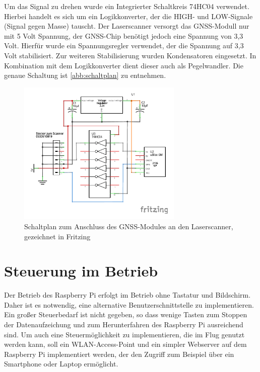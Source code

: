 \documentclass[a4paper,12pt,bibliography=totoc, listof=totoc,titlepage,pointlessnumbers]{scrreprt}
\begin{document}
Um das Signal zu drehen wurde ein Integrierter Schaltkreis 74HC04 verwendet. Hierbei handelt es sich um ein Logikkonverter, der die HIGH- und LOW-Signale (Signal gegen Masse) tauscht. Der Laserscanner versorgt das GNSS-Modull nur mit 5 Volt Spannung, der GNSS-Chip benötigt jedoch eine Spannung von 3,3 Volt. Hierfür wurde ein Spannungsregler verwendet, der die Spannung auf 3,3 Volt stabilisiert. Zur weiteren Stabilisierung wurden Kondensatoren eingesetzt. In Kombination mit dem Logikkonverter dient dieser auch als Pegelwandler. Die genaue Schaltung ist \autoref{abb:schaltplan} zu entnehmen.

\begin{figure}[ht!]
 \centering
 \includegraphics[width=0.7\textwidth]{img/GPS_Schaltung.pdf}
 \caption{Schaltplan zum Anschluss des GNSS-Modules an den Laserscanner, gezeichnet in Fritzing}
 \label{abb:schaltplan}
\end{figure}

\section{Steuerung im Betrieb}
\label{s:steuermodul}
Der Betrieb des Raspberry Pi erfolgt im Betrieb ohne Tastatur und Bildschirm. Daher ist es notwendig, eine alternative Benutzerschnittstelle zu implementieren. Ein großer Steuerbedarf ist nicht gegeben, so dass wenige Tasten zum Stoppen der Datenaufzeichung und zum Herunterfahren des Raspberry Pi ausreichend sind. Um auch eine Steuermöglichkeit zu implementieren, die im Flug genutzt werden kann, soll ein WLAN-Access-Point und ein simpler Webserver auf dem Raspberry Pi implementiert werden, der den Zugriff zum Beispiel über ein Smartphone oder Laptop ermöglicht.
\end{document}
